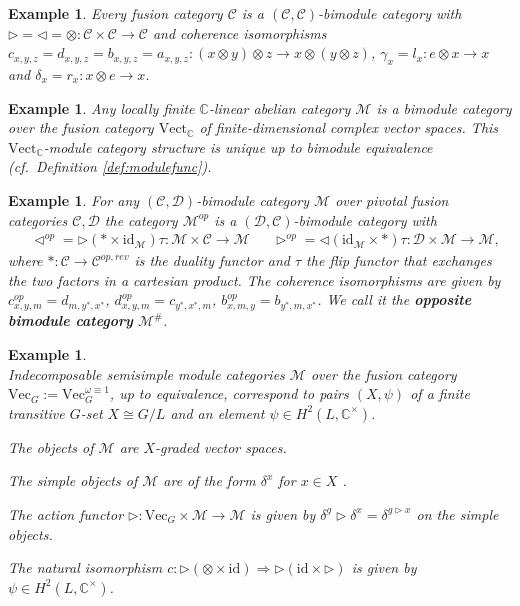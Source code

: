 \documentclass[1.5pt, a4paper]{article}
\newcommand{\C}{\mathbb{C}}
\newcommand{\mac}{\mathcal C}
\newcommand{\mad}{\mathcal D}
\newcommand{\mam}{\mathcal M}
\newcommand{\oo}[0]{\otimes}
\newcommand{\id}[0]{\mathrm{id}}
\newtheorem{example}[theorem]{Example}
\begin{document}
\begin{example}\label{ex:bimodulecategory} 
 Every  fusion category $\mac$ is a $(\mac,\mac)$-bimodule category with $\rhd=\lhd=\oo:\mac\times\mac\to\mac$ and  coherence isomorphisms $c_{x,y,z}=d_{x,y,z}=b_{x,y,z}=a_{x,y,z}: (x\oo y)\oo z\to x\oo (y\oo z)$, $\gamma_x=l_x: e\oo x\to x$ and $\delta_x=r_x: x\oo e\to x$.
 \end{example}

\begin{example}\label{ex:vecmodule}
 Any locally finite $\C$-linear abelian category $\mam$ is a bimodule category over the fusion category $\mathrm{Vect}_\C$ of finite-dimensional complex vector spaces.  This  $\mathrm{Vect}_\C$-module category structure is unique up to bimodule equivalence (cf.~Definition \ref{def:modulefunc}).
\end{example}

\begin{example}\label{ex:dualcat}
For  any $(\mac,\mad)$-bimodule category $\mam$ over pivotal fusion categories $\mac,\mad$ the category $\mam^{op}$ is a $(\mad,\mac)$-bimodule category with 
\begin{align}\label{eq:opcat}
&\lhd^{op}=\rhd (*\times  \id_\mam)\tau: \mam\times\mac\to\mam & &\rhd^{op}=\lhd (\id_\mam\times *)\tau: \mad\times \mam\to\mam,
\end{align}
where $*: \mac\to\mac^{op,rev}$ is the duality functor  and  $\tau$ the flip functor that exchanges the two factors in a cartesian product. 
The coherence isomorphisms are given by $c^{op}_{x,y,m}=d_{m,y^*,x^*}$, $d^{op}_{x,y,m}=c_{y^*,x^*, m}$, $b^{op}_{x,m,y}=b_{y^*,m,x^*}$.
We call it the {\bf opposite bimodule category}  $\mam^\#$.
\end{example}




\begin{example} \label{ex:modvectgomega} \cite[Ex.~7.4.10]{EGNO}\\ Indecomposable semisimple module categories $\mam$  over  the fusion category $\mathrm{Vec}_G:=\mathrm{Vec}_G^{\omega\equiv 1}$, 
up to equivalence, correspond to pairs $(X, \psi)$ of a  finite transitive $G$-set $X\cong G/L$ and an element $\psi\in H^2(L, \C^{\times})$.
\begin{compactitem}
\item The objects of $\mam$ are $X$-graded vector spaces.
\item The simple objects of $\mam$ are of the form $\delta^x$ for $x\in X$ . 

\item The action functor $\rhd: \mathrm{Vec}_G\times\mam\to\mam$ is given by $\delta^g\rhd \delta^x=\delta^{g\rhd x}$ on the simple objects. 

\item The natural isomorphism $c:\rhd(\oo\times \id)\Rightarrow \rhd(\id\times\rhd)$ is given by $\psi\in H^2(L,\C^\times)$.
\end{compactitem}
\end{example}
\end{document}
